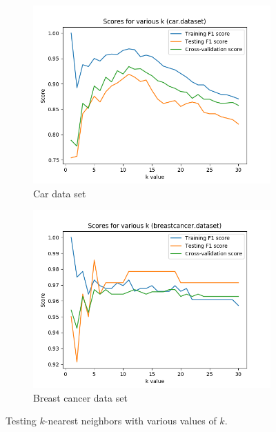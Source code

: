 \documentclass{article}
\begin{document}
    \begin{figure}[htb]
    \centering

    \begin{subfigure}{0.5\textwidth}
      \includegraphics[width=\linewidth]{out/knn/car-k-testing.png}
      \caption{Car data set}
      \label{fig:knn-param-1}
    \end{subfigure}\hfil
    \begin{subfigure}{0.5\textwidth}
      \includegraphics[width=\linewidth]{out/knn/breastcancer-k-testing.png}
      \caption{Breast cancer data set}
      \label{fig:knn-param-2}
    \end{subfigure}

    \caption{Testing $k$-nearest neighbors with various values of $k$.}
    \label{fig:knn-param}
    \end{figure}
\end{document}
